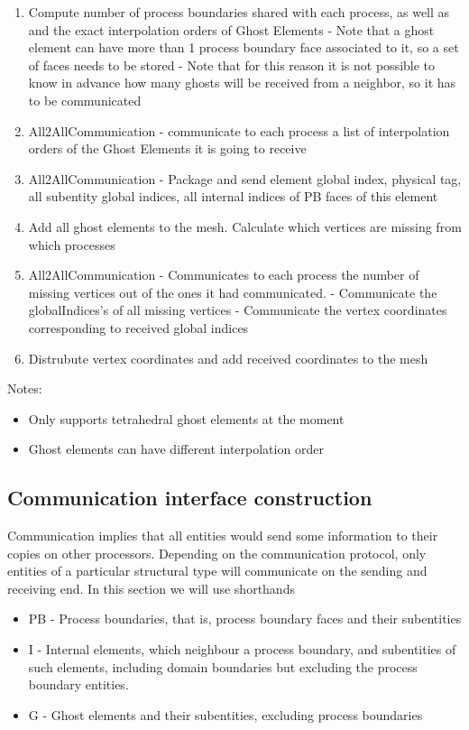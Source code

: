 \begin{enumerate}
	\item Compute number of process boundaries shared with each process, as well as and the exact interpolation orders of Ghost Elements
		\subitem - Note that a ghost element can have more than 1 process boundary face associated to it, so a set of faces needs to be stored
		\subitem - Note that for this reason it is not possible to know in advance how many ghosts will be received from a neighbor, so it has to be communicated
	\item All2AllCommunication - communicate to each process a list of interpolation orders of the Ghost Elements it is going to receive
	\item All2AllCommunication - Package and send element global index, physical tag, all subentity global indices, all internal indices of PB faces of this element
	\item Add all ghost elements to the mesh. Calculate which vertices are missing from which processes
	\item All2AllCommunication - Communicates to each process the number of missing vertices out of the ones it had communicated.
		\subitem - Communicate the globalIndices's of all missing vertices
		\subitem - Communicate the vertex coordinates corresponding to received global indices
	\item Distrubute vertex coordinates and add received coordinates to the mesh	
\end{enumerate}

\noindent
Notes: 

\begin{itemize}
	\item Only supports tetrahedral ghost elements at the moment
	\item Ghost elements can have different interpolation order 
\end{itemize}





\subsection{Communication interface construction}
\label{impl-grid-constructor-comm}

Communication implies that all entities would send some information to their copies on other processors. Depending on the communication protocol, only entities of a particular structural type will communicate on the sending and receiving end. In this section we will use shorthands
\begin{itemize}
	\item PB - Process boundaries, that is, process boundary faces and their subentities
	\item I - Internal elements, which neighbour a process boundary, and subentities of such elements, including domain boundaries but excluding the process boundary entities.
	\item G - Ghost elements and their subentities, excluding process boundaries
\end{itemize}

